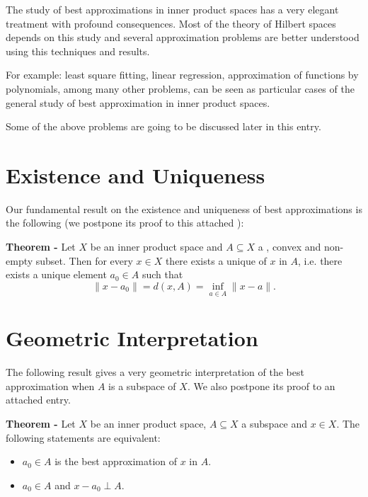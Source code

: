\documentclass[12pt]{article}
\begin{document}

The study of best approximations in inner product spaces has a very elegant treatment with profound consequences. Most of the theory of Hilbert spaces depends on this study and several approximation problems are better understood using this techniques and results.

For example: least square fitting, linear regression, approximation of functions by polynomials, among many other problems, can be seen as particular cases of the general study of best approximation in inner product spaces.

Some of the above problems are going to be discussed later in this entry.

\section{Existence and Uniqueness}
Our fundamental result on the existence and uniqueness of best approximations is the following (we postpone its proof to this attached ):

{\bf Theorem -} Let $X$ be an inner product space and $A \subseteq X$ a , convex and non-empty subset. Then for every $x \in X$ there exists a unique  of $x$ in $A$, i.e. there exists a unique element $a_0 \in A$ such that
\begin{displaymath}
\|x-a_0\| = d(x,A) =  \inf_{a \in A} \|x - a\|.
\end{displaymath}

\section{Geometric Interpretation}

The following result gives a very geometric interpretation of the best approximation when $A$ is a subspace of $X$. We also postpone its proof to an attached entry.

{\bf Theorem -} Let $X$ be an inner product space, $A \subseteq X$ a subspace and $x \in X$. The following statements are equivalent:
\begin{itemize}
\item $a_0 \in A$ is the best approximation of $x$ in $A$.
\item $a_0 \in A$ and $x-a_0 \perp A$.
\end{itemize}
\end{document}
